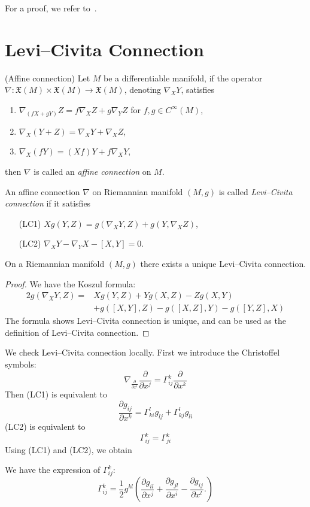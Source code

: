 For a proof, we refer to~\cite[Theorem~13.29]{Lee}.

\section{Levi--Civita Connection}

\begin{defn}(Affine connection)
    Let $M$ be a differentiable manifold, if the operator $\nabla:\mathfrak{X}(M)\times\mathfrak{X}(M)\to\mathfrak{X}(M)$, denoting $\nabla_XY$, satisfies
    \begin{enumerate}[(1)]
        \item $\nabla_{(fX+gY)}Z=f\nabla_XZ+g\nabla_YZ$ for $f,g\in C^\infty(M)$,
        \item $\nabla_X(Y+Z)=\nabla_XY+\nabla_XZ$,
        \item $\nabla_X(fY)=(Xf)Y+f\nabla_XY$,
    \end{enumerate}
    then $\nabla$ is called an \emph{affine connection} on $M$.
\end{defn}

\begin{defn}
    An affine connection $\nabla$ on Riemannian manifold $(M,g)$ is called \emph{Levi--Civita connection} if it satisfies
    \begin{itemize}
        \item[(LC1)] $Xg(Y,Z)=g(\nabla_XY,Z)+g(Y,\nabla_XZ)$,
        \item[(LC2)] $\nabla_XY-\nabla_YX-[X,Y]=0$.
    \end{itemize}
\end{defn}

\begin{prop}
    On a Riemannian manifold $(M,g)$ there exists a unique Levi--Civita connection.
\end{prop}
\begin{proof}
    We have the Koszul formula:
    \begin{align*}
        2g(\nabla_XY,Z)=&Xg(Y,Z)+Yg(X,Z)-Zg(X,Y)\\
        &+g([X,Y],Z)-g([X,Z],Y)-g([Y,Z],X)
    \end{align*}
    The formula shows Levi--Civita connection is unique, and can be used as the definition of Levi--Civita connection.
\end{proof}

We check Levi--Civita connection locally.
First we introduce the Christoffel symbols:
\[\nabla_{\frac{\partial{}}{\partial{x^i}}}\frac{\partial{}}{\partial{x^j}}=\Gamma^k_{ij}\frac{\partial{}}{\partial{x^k}}\]
Then (LC1) is equivalent to
\[\frac{\partial{g_{ij}}}{\partial{x^k}}=\Gamma^l_{ki}g_{lj}+\Gamma^l_{kj}g_{li}\]
(LC2) is equivalent to
\[\Gamma^k_{ij}=\Gamma^k_{ji}\]
Using (LC1) and (LC2), we obtain
\begin{prop}
    We have the expression of $\Gamma^k_{ij}$:
    \[\Gamma^k_{ij}=\frac{1}{2}g^{kl}\left(\frac{\partial{g_{il}}}{\partial{x^j}}+\frac{\partial{g_{jl}}}{\partial{x^i}}-\frac{\partial{g_{ij}}}{\partial{x^l}}.\right)\]
\end{prop}

